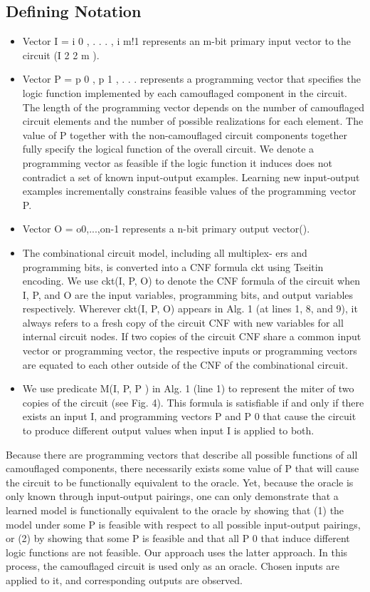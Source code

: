 \documentclass[proposal]{umassthesis}  %
\begin{document}
\subsection{Defining Notation}
\begin{itemize}
\item Vector I = {i 0 , . . . , i m!1 } represents an m-bit primary input vector to the circuit (I 2 2 m ).
\item Vector P = {p 0 , p 1 , . . .} represents a programming vector that specifies the logic function implemented by each camouflaged component in the circuit. The length of the programming vector depends on the number of camouflaged circuit elements and the number of possible realizations for each element. The value of P together with the non-camouflaged circuit components together fully specify the logical function of the overall circuit. We denote a programming vector as feasible if the logic function it induces does not contradict a set of known input-output examples. Learning new input-output examples incrementally constrains feasible values of the programming vector P.
\item Vector O = {o0,...,on-1} represents a n-bit primary output vector().
\item The combinational circuit model, including all multiplex- ers and programming bits, is converted into a CNF formula ckt using Tseitin encoding. We use ckt(I, P, O) to denote the CNF formula of the circuit when I, P, and O are the input variables, programming bits, and output variables respectively. Wherever ckt(I, P, O) appears in Alg. 1 (at lines 1, 8, and 9), it always refers to a fresh copy of the circuit CNF with new variables for all internal circuit nodes. If two copies of the circuit CNF share a common input vector or programming vector, the respective inputs or programming vectors are equated to each other outside of the CNF of the combinational circuit.
\item We use predicate M(I, P, P ) in Alg. 1 (line 1) to represent the miter of two copies of the circuit (see Fig. 4). This formula is satisfiable if and only if there exists an input I, and programming vectors P and P 0 that cause the circuit to produce different output values when input I is applied to both.
\end{itemize}

Because there are programming vectors that describe all possible functions of all camouflaged components, there necessarily exists some value of P that will cause the circuit to be functionally equivalent to the oracle. Yet, because the oracle is only known through input-output pairings, one can only demonstrate that a learned model is functionally equivalent to the oracle by showing that (1) the model under some P is feasible with respect to all possible input-output pairings, or (2) by showing that some P is feasible and that all P 0 that induce different logic functions are not feasible. Our approach uses the latter approach. In this process, the camouflaged circuit is used only as an oracle. Chosen inputs are applied to it, and corresponding outputs are observed.
\end{document}
